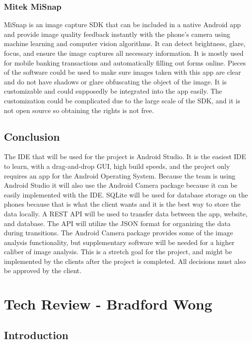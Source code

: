 \documentclass[onecolumn, draftclsnofoot,10pt, compsoc]{IEEEtran}
\begin{document}
\subsubsection{Mitek MiSnap}
MiSnap is an image capture SDK that can be included in a native Android app and provide image quality feedback instantly with the phone's camera using machine learning and computer vision algorithms. 
It can detect brightness, glare, focus, and ensure the image captures all necessary information. 
It is mostly used for mobile banking transactions and automatically filling out forms online. 
Pieces of the software could be used to make sure images taken with this app are clear and do not have shadows or glare obfuscating the object of the image. 
It is customizable and could supposedly be integrated into the app easily. 
The customization could be complicated due to the large scale of the SDK, and it is not open source so obtaining the rights is not free. 
\cite{Misnap}

\subsection{Conclusion}

The IDE that will be used for the project is Android Studio. 
It is the easiest IDE to learn, with a drag-and-drop GUI, high build speeds, and the project only requires an app for the Android Operating System. 
Because the team is using Android Studio it will also use the Android Camera package because it can be easily implemented with the IDE. 
SQLite will be used for database storage on the phones because that is what the client wants and it is the best way to store the data locally. 
A REST API will be used to transfer data between the app, website, and database. 
The API will utilize the JSON format for organizing the data during transitions. 
The Android Camera package provides some of the image analysis functionality, but supplementary software will be needed for a higher caliber of image analysis. 
This is a stretch goal for the project, and might be implemented by the clients after the project is completed. 
All decisions must also be approved by the client. 
 
 \section{Tech Review - Bradford Wong}
 \subsection{Introduction}
\end{document}
